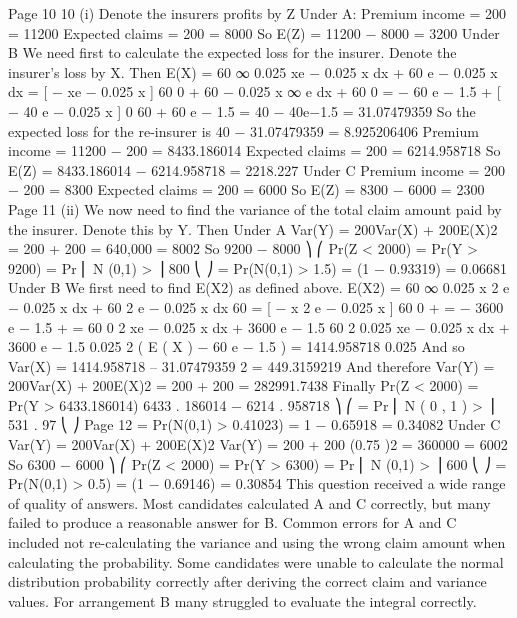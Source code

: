 Page 10%
10
(i)
Denote the insurers profits by Z
Under A:
Premium income = 200   = 11200
Expected claims = 200  = 8000
So E(Z) = 11200 − 8000 = 3200
Under B
We need first to calculate the expected loss for the insurer. Denote the
insurer’s loss by X. Then
E(X) =
60
∞
0.025 xe − 0.025 x dx + 60 \times  {} e − 0.025 x dx
= [ − xe − 0.025 x ] 60
0 + 
60 − 0.025 x
∞
e
dx + 60 
0
= − 60 e − 1.5 + [ − 40 e − 0.025 x ] 0 60 + 60 e − 1.5
= 40 − 40e−1.5 = 31.07479359
So the expected loss for the re-insurer is 40 − 31.07479359 = 8.925206406
Premium income = 11200 − 200   = 8433.186014
Expected claims = 200  = 6214.958718
So E(Z) = 8433.186014 − 6214.958718 = 2218.227
Under C
Premium income = 200   − 200    = 8300
Expected claims = 200   = 6000
So E(Z) = 8300 − 6000 = 2300
Page 11%
(ii)
We now need to find the variance of the total claim amount paid by the
insurer. Denote this by Y. Then
Under A
Var(Y) = 200Var(X) + 200E(X)2
= 200  + 200  = 640,000 = 8002
So
9200 − 8000 ⎞
⎛
Pr(Z < 2000) = Pr(Y > 9200) = Pr ⎜ N (0,1) >
⎟
800
⎝
⎠
= Pr(N(0,1) > 1.5) = (1 − 0.93319) = 0.06681
Under B
We first need to find E(X2) as defined above.
E(X2) =
60
∞
0.025 x 2 e − 0.025 x dx + 60 2  e − 0.025 x dx
60
= [ − x 2 e − 0.025 x ] 60
0 + \int 
= − 3600 e − 1.5 +
=
60
0
2 xe − 0.025 x dx + 3600 e − 1.5
60
2
0.025 xe − 0.025 x dx + 3600 e − 1.5
0.025
2
( E ( X ) − 60 e − 1.5 ) = 1414.958718
0.025
And so
Var(X) = 1414.958718 – 31.07479359 2 = 449.3159219
And therefore
Var(Y) = 200Var(X) + 200E(X)2
= 200  + 200  = 282991.7438
Finally
Pr(Z < 2000) = Pr(Y > 6433.186014)
6433 . 186014 − 6214 . 958718 ⎞
⎛
= Pr ⎜ N ( 0 , 1 ) >
⎟
531 . 97
⎝
⎠
Page 12%
= Pr(N(0,1) > 0.41023) = 1 − 0.65918 = 0.34082
Under C
Var(Y) = 200Var(X) + 200E(X)2
Var(Y) = 200   + 200 \times  (0.75 )2 = 360000 = 6002
So
6300 − 6000 ⎞
⎛
Pr(Z < 2000) = Pr(Y > 6300) = Pr ⎜ N (0,1) >
⎟
600
⎝
⎠
= Pr(N(0,1) > 0.5) = (1 − 0.69146) = 0.30854
This question received a wide range of quality of answers. Most candidates calculated
A and C correctly, but many failed to produce a reasonable answer for B. Common
errors for A and C included not re-calculating the variance and using the wrong
claim amount when calculating the probability. Some candidates were unable to
calculate the normal distribution probability correctly after deriving the correct claim
and variance values. For arrangement B many struggled to evaluate the integral
correctly.
